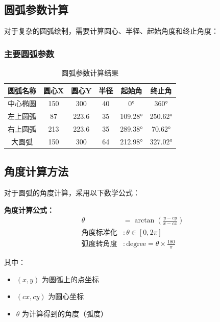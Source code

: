 \documentclass[12pt,a4paper]{article}
\begin{document}
\subsection{圆弧参数计算}

对于复杂的圆弧绘制，需要计算圆心、半径、起始角度和终止角度：

\subsubsection{主要圆弧参数}

\begin{table}[H]
\centering
\caption{圆弧参数计算结果}
\begin{tabular}{|c|c|c|c|c|c|}
\hline
\textbf{圆弧名称} & \textbf{圆心X} & \textbf{圆心Y} & \textbf{半径} & \textbf{起始角} & \textbf{终止角} \\
\hline
中心椭圆 & 150 & 300 & 40 & 0° & 360° \\
\hline
左上圆弧 & 87 & 223.6 & 35 & 109.28° & 250.62° \\
\hline
右上圆弧 & 213 & 223.6 & 35 & 289.38° & 70.62° \\
\hline
大圆弧 & 150 & 300 & 64 & 212.98° & 327.02° \\
\hline
\end{tabular}
\end{table}

\subsection{角度计算方法}

对于圆弧的角度计算，采用以下数学公式：

\begin{tcolorbox}
\textbf{角度计算公式：}
\begin{align}
\theta &= \arctan\left(\frac{y - cy}{x - cx}\right) \\
\text{角度标准化} &: \theta \in [0, 2\pi] \\
\text{弧度转角度} &: \text{degree} = \theta \times \frac{180}{\pi}
\end{align}
\end{tcolorbox}

其中：
\begin{itemize}
    \item $(x, y)$ 为圆弧上的点坐标
    \item $(cx, cy)$ 为圆心坐标
    \item $\theta$ 为计算得到的角度（弧度）
\end{itemize}
\end{document}
